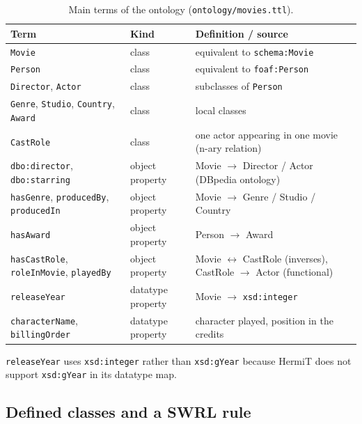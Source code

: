 \documentclass[11pt,a4paper]{article}
\newcommand{\code}[1]{\texttt{#1}}
\begin{document}
\begin{table}[H]
\centering\small
\caption{Main terms of the ontology (\code{ontology/movies.ttl}).}\label{tab:terms}
\begin{tabularx}{\textwidth}{@{}>{\raggedright\arraybackslash}p{4.4cm}l>{\raggedright\arraybackslash}X@{}}
\toprule
Term & Kind & Definition / source \\
\midrule
\code{Movie} & class & equivalent to \code{schema:Movie} \\
\code{Person} & class & equivalent to \code{foaf:Person} \\
\code{Director}, \code{Actor} & class & subclasses of \code{Person} \\
\code{Genre}, \code{Studio}, \code{Country}, \code{Award} & class & local classes \\
\code{CastRole} & class & one actor appearing in one movie (n-ary relation) \\
\code{dbo:director}, \code{dbo:starring} & object property & Movie $\rightarrow$ Director / Actor (DBpedia ontology) \\
\code{hasGenre}, \code{producedBy}, \code{producedIn} & object property & Movie $\rightarrow$ Genre / Studio / Country \\
\code{hasAward} & object property & Person $\rightarrow$ Award \\
\code{hasCastRole}, \code{roleInMovie}, \code{playedBy} & object property & Movie $\leftrightarrow$ CastRole (inverses), CastRole $\rightarrow$ Actor (functional) \\
\code{releaseYear} & datatype property & Movie $\rightarrow$ \code{xsd:integer} \\
\code{characterName}, \code{billingOrder} & datatype property & character played, position in the credits \\
\bottomrule
\end{tabularx}
\end{table}

\noindent \code{releaseYear} uses \code{xsd:integer} rather than \code{xsd:gYear} because HermiT does not support \code{xsd:gYear} in its datatype map.

\subsection{Defined classes and a SWRL rule}
\end{document}
